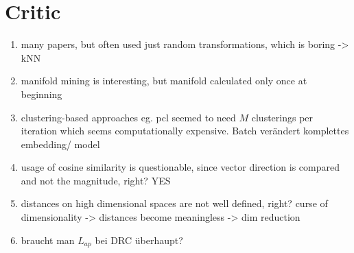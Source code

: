 \section{Critic}\label{sec:critic}

\begin{enumerate}
    \item many papers, but often used just random transformations, which is boring -> kNN
    \item manifold mining is interesting, but manifold calculated only once at beginning
    \item clustering-based approaches eg. \ac{pcl} seemed to need $M$ clusterings per iteration 
    which seems computationally expensive. Batch verändert komplettes embedding/ model
    \item usage of cosine similarity is questionable, since vector direction is compared and 
    not the magnitude, right? YES
    \item distances on high dimensional spaces are not well defined, right? curse of dimensionality -> distances become meaningless -> dim reduction
    \item braucht man $L_{ap}$ bei DRC überhaupt?
\end{enumerate}

